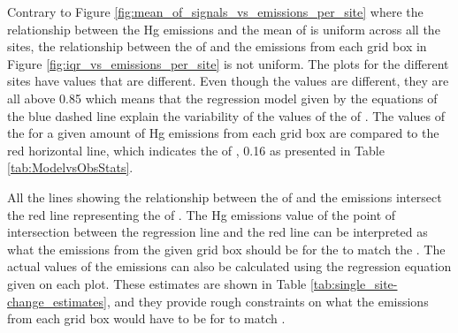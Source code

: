 \newpage
\begin{flushleft}
    Contrary to Figure \ref{fig:mean_of_signals_vs_emissions_per_site} where the relationship between the Hg emissions and the mean of \modelc is uniform across all the sites, the relationship between the \iq of \modelc  and the emissions from each grid box in Figure \ref{fig:iqr_vs_emissions_per_site} is not uniform. The plots for the different sites have \rsq values that are different. Even though the \rsq values are different, they are all above 0.85 which means that the regression model given by the equations of the blue dashed line explain the variability of the values of the \iq of \modelc. The values of the \iq for a given amount of Hg emissions from each grid box are compared to the red horizontal line, which indicates the \iq of \obsC, 0.16 as presented in Table \ref{tab:ModelvsObsStats}. 
\end{flushleft}
\begin{flushleft}
     All the lines showing the relationship between the \iq of \modelc and the emissions intersect the red line representing the \iq of \obsC. The Hg emissions value of the point of intersection between the regression line and the red line can be interpreted as what the emissions from the given grid box should be for the \modelc to match the \obsC. The actual values of the emissions can also be calculated using the regression equation given on each plot. These estimates are shown in Table \ref{tab:single_site-change_estimates}, and they provide rough constraints on what the emissions from each grid box would have to be for \modelc to match \obsC.
     
     
\end{flushleft}

